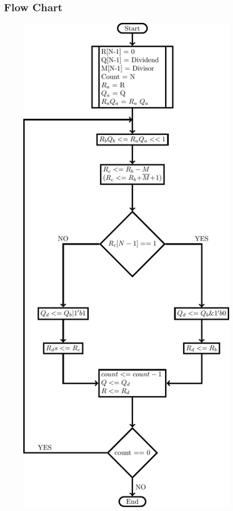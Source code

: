 \documentclass{article}
\begin{document}
\subsection{Flow Chart}
\begin{figure}[H]
    \centering
    \includegraphics[scale=0.55]{../Resources/TexFiles/RestoringDivision.pdf}
\end{figure}
\end{document}

